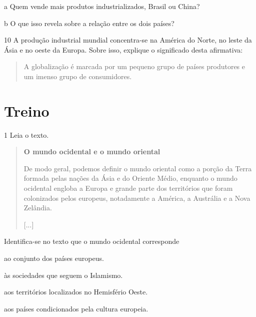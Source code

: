 \num{a} Quem vende mais produtos industrializados, Brasil ou China?



\num{b} O que isso revela sobre a relação entre os dois países?



\num{10} A produção industrial mundial concentra-se na América do Norte, no leste
da Ásia e no oeste da Europa. Sobre isso, explique o significado desta afirmativa:

\begin{quote}
A globalização é marcada por um pequeno grupo de países produtores e um
imenso grupo de consumidores.
\end{quote}



\section{Treino}

\num{1} Leia o texto.

\begin{quote}
\textbf{O mundo ocidental e o mundo oriental}

De modo geral, podemos definir o mundo oriental como a porção
da Terra formada pelas nações da Ásia e do Oriente Médio, enquanto o
mundo ocidental engloba a Europa e grande parte dos territórios que
foram colonizados pelos europeus, notadamente a América, a Austrália e a
Nova Zelândia.

{[}...{]}

\end{quote}

Identifica-se no texto que o mundo ocidental corresponde

\begin{escolha}
\item
  ao conjunto dos países europeus.
\item
  às sociedades que seguem o Islamismo.
\item
  aos territórios localizados no Hemisfério Oeste.
\item
  aos países condicionados pela cultura europeia.
\end{escolha}

